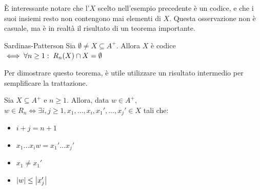 È interessante notare che l'\(X\) scelto nell'esempio precedente è un codice, e che i suoi insiemi resto non contengono mai elementi di \(X\).
Questa osservazione non è casuale, ma è in realtà il risultato di un teorema importante.
\begin{theorem}[namedlabel={thm:sardinas-patterson}{Sardinas-Patterson}]{Sardinas-Patterson}
  Sia \(\emptyset \neq X \subseteq A^+\). Allora \(X\) è codice \(\iff \forall n\geq 1:\; R_n(X) \cap X = \emptyset\)
\end{theorem}

Per dimostrare questo teorema, è utile utilizzare un risultato intermedio per semplificare la trattazione.

\begin{lemma}[label=lem:sardinas-patterson-intermediate]{}
  Sia \(X \subseteq A^+\) e \(n\geq 1\). Allora, data \(w \in A^+\), \(w \in R_n \iff \exists i,j\geq 1, x_1,\ldots,x_i,x_1',\ldots,x_j' \in X\) tali che:
  \begin{itemize}
    \item \(i+j=n+1\)
    \item \(x_1\ldots x_{i}w = x_1'\ldots x_j'\)
    \item \(x_1 \neq x_1'\)
    \item \(\left|w\right| \leq \left|x_j'\right|\)
  \end{itemize}
\end{lemma}


